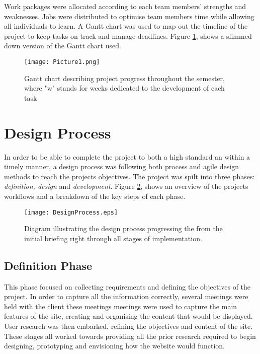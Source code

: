 \documentclass[fontsize=11pt]{extarticle}
\numberwithin{figure}{section} %
\numberwithin{table}{section}%
\begin{document}
Work packages were allocated according to each team members' strengths
and weaknesses. Jobs were distributed to optimise team members time
while allowing all individuals to learn. A Gantt chart was used to map
out the timeline of the project to keep tasks on track and manage
deadlines. Figure \ref{gantt}, shows a slimmed down version of the Gantt
chart used.

\begin{landscape}
\begin{figure}[H]
      \centering
      \texttt{[image: Picture1.png]}
      \caption{Gantt chart describing project progress throughout the semester, where "w" stands for weeks dedicated to the development of each task}
\label{gantt}
 \end{figure}
 \end{landscape}

\newpage

\hypertarget{design-process}{%
\section{Design Process}\label{design-process}}

In order to be able to complete the project to both a high standard an
within a timely manner, a design process was following both process and
agile design methods to reach the projects objectives. The project was
spilt into three phases: \emph{definition, design} and
\emph{development}. Figure \ref{designprocess}, shows an overview of the
projects workflows and a breakdown of the key steps of each phase.

\begin{figure}[H]
\centering
\texttt{[image: DesignProcess.eps]}
\caption{Diagram illustrating the design process progressing the from the initial briefing right through all stages of implementation.}
\label{designprocess}
\end{figure}

\hypertarget{definition-phase}{%
\subsection{Definition Phase}\label{definition-phase}}

This phase focused on collecting requirements and defining the
objectives of the project. In order to capture all the information
correctly, several meetings were held with the client these meetings
meetings were used to capture the main features of the site, creating
and organising the content that would be displayed. User research was
then embarked, refining the objectives and content of the site. These
stages all worked towards providing all the prior research required to
begin designing, prototyping and envisioning how the website would
function.
\end{document}
